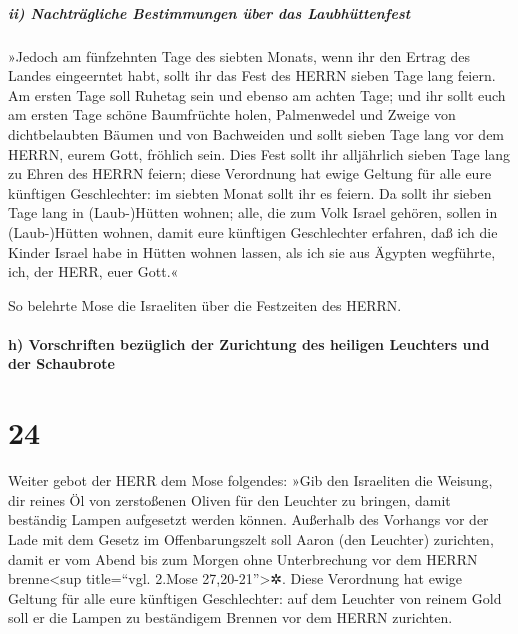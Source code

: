 \hypertarget{ii-nachtruxe4gliche-bestimmungen-uxfcber-das-laubhuxfcttenfest}{%
\subparagraph{ii) Nachträgliche Bestimmungen über das
Laubhüttenfest}\label{ii-nachtruxe4gliche-bestimmungen-uxfcber-das-laubhuxfcttenfest}}

»Jedoch am fünfzehnten Tage des siebten Monats, wenn ihr
den Ertrag des Landes eingeerntet habt, sollt ihr das Fest des HERRN
sieben Tage lang feiern. Am ersten Tage soll Ruhetag sein und ebenso am
achten Tage; und ihr sollt euch am ersten Tage schöne
Baumfrüchte holen, Palmenwedel und Zweige von dichtbelaubten Bäumen und
von Bachweiden und sollt sieben Tage lang vor dem HERRN, eurem Gott,
fröhlich sein. Dies Fest sollt ihr alljährlich sieben
Tage lang zu Ehren des HERRN feiern; diese Verordnung hat ewige Geltung
für alle eure künftigen Geschlechter: im siebten Monat sollt ihr es
feiern. Da sollt ihr sieben Tage lang in (Laub-)Hütten
wohnen; alle, die zum Volk Israel gehören, sollen in (Laub-)Hütten
wohnen, damit eure künftigen Geschlechter erfahren, daß
ich die Kinder Israel habe in Hütten wohnen lassen, als ich sie aus
Ägypten wegführte, ich, der HERR, euer Gott.«

So belehrte Mose die Israeliten über die Festzeiten des
HERRN.

\hypertarget{h-vorschriften-bezuxfcglich-der-zurichtung-des-heiligen-leuchters-und-der-schaubrote}{%
\paragraph{h) Vorschriften bezüglich der Zurichtung des heiligen
Leuchters und der
Schaubrote}\label{h-vorschriften-bezuxfcglich-der-zurichtung-des-heiligen-leuchters-und-der-schaubrote}}

\hypertarget{section-23}{%
\section{24}\label{section-23}}

Weiter gebot der HERR dem Mose folgendes:
»Gib den Israeliten die Weisung, dir reines Öl von
zerstoßenen Oliven für den Leuchter zu bringen, damit beständig Lampen
aufgesetzt werden können. Außerhalb des Vorhangs vor der
Lade mit dem Gesetz im Offenbarungszelt soll Aaron (den Leuchter)
zurichten, damit er vom Abend bis zum Morgen ohne Unterbrechung vor dem
HERRN brenne\textless sup title=``vgl. 2.Mose 27,20-21''\textgreater✲.
Diese Verordnung hat ewige Geltung für alle eure künftigen Geschlechter:
auf dem Leuchter von reinem Gold soll er die Lampen zu
beständigem Brennen vor dem HERRN zurichten.

